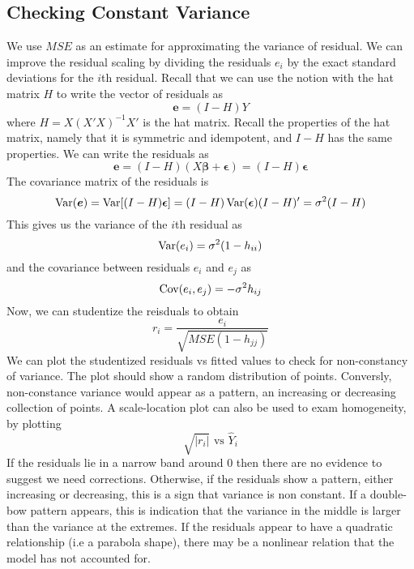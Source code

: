\subsection{Checking Constant Variance}

We use $MSE$ as an estimate for approximating the variance of residual. We can improve the residual scaling by dividing the residuals $e_i$ by the exact standard deviations for the $i$th residual. Recall that we can use the notion with the hat matrix $H$ to write the vector of residuals as 
\[\boldsymbol{e} = (I-H)Y\]
where $H = X(X'X)^{-1}X'$ is the hat matrix. Recall the properties of the hat matrix, namely that it is symmetric and idempotent, and $I-H$ has the same properties. We can write the residuals as 
\[\boldsymbol{e} = (I-H)(X\boldsymbol{\beta} + \boldsymbol{\epsilon}) = (I-H)\boldsymbol{\epsilon}\]
The covariance matrix of the residuals is 
\[\operatorname{Var}(\boldsymbol{e}) = \operatorname{Var}[(I-H)\boldsymbol{\epsilon}] = (I-H)\operatorname{Var}(\boldsymbol{\epsilon})(I-H)' = \sigma^2(I-H)\]
This gives us the variance of the $i$th residual as
\[\operatorname{Var}(e_i) = \sigma^2(1-h_{ii})\]
and the covariance between residuals $e_i$ and $e_j$ as 
\[\operatorname{Cov}(e_i,e_j) = -\sigma^2h_{ij}\]
Now, we can studentize the reisduals to obtain 
\[r_i = \frac{e_i}{\sqrt{MSE(1-h_{jj})}}\]
We can plot the studentized residuals vs fitted values to check for non-constancy of variance. The plot should show a random distribution of points. Conversly, non-constance variance would appear as a pattern, an increasing or decreasing collection of points. A scale-location plot can also be used to exam homogeneity, by plotting 
\[\sqrt{|r_i|} \text{ vs } \hat{Y}_i\]
If the residuals lie in a narrow band around 0 then there are no evidence to suggest we need corrections. Otherwise, if the residuals show a pattern, either increasing or decreasing, this is a sign that variance is non constant. If a double-bow pattern appears, this is indication that the variance in the middle is larger than the variance at the extremes. If the residuals appear to have a quadratic relationship (i.e a parabola shape), there may be a nonlinear relation that the model has not accounted for.